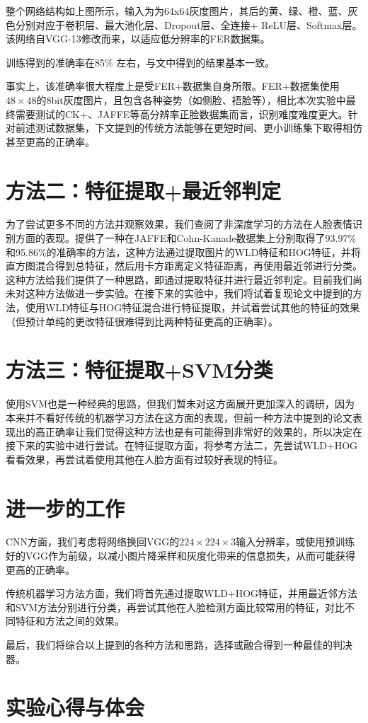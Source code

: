 \documentclass[UTF8]{ctexart}
\begin{document}
整个网络结构如上图所示，输入为为64x64灰度图片，其后的黄、绿、橙、蓝、灰色分别对应于卷积层、最大池化层、Dropout层、全连接+ ReLU层、Softmax层。该网络自VGG-13修改而来，以适应低分辨率的FER数据集。

训练得到的准确率在85\% 左右，与文中得到的结果基本一致。

事实上，该准确率很大程度上是受FER+数据集自身所限。FER+数据集使用$48\times48$的8bit灰度图片，且包含各种姿势（如侧脸、捂脸等），相比本次实验中最终需要测试的CK+、JAFFE等高分辨率正脸数据集而言，识别难度难度更大。针对前述测试数据集，下文提到的传统方法能够在更短时间、更小训练集下取得相仿甚至更高的正确率。

\section{方法二：特征提取+最近邻判定}

为了尝试更多不同的方法并观察效果，我们查阅了非深度学习的方法在人脸表情识别方面的表现。\cite{wang2013feature}提供了一种在JAFFE和Cohn-Kanade数据集上分别取得了93.97\%和95.86\%的准确率的方法，这种方法通过提取图片的WLD特征和HOG特征，并将直方图混合得到总特征，然后用卡方距离定义特征距离，再使用最近邻进行分类。这种方法给我们提供了一种思路，即通过提取特征并进行最近邻判定。目前我们尚未对这种方法做进一步实验。在接下来的实验中，我们将试着复现论文中提到的方法，使用WLD特征与HOG特征混合进行特征提取，并试着尝试其他的特征的效果（但预计单纯的更改特征很难得到比两种特征更高的正确率）。

\section{方法三：特征提取+SVM分类}

使用SVM也是一种经典的思路，但我们暂未对这方面展开更加深入的调研，因为本来并不看好传统的机器学习方法在这方面的表现，但前一种方法中提到的论文表现出的高正确率让我们觉得这种方法也是有可能得到非常好的效果的，所以决定在接下来的实验中进行尝试。在特征提取方面，将参考方法二，先尝试WLD+HOG看看效果，再尝试着使用其他在人脸方面有过较好表现的特征。

\section{进一步的工作}

CNN方面，我们考虑将网络换回VGG的$224\times224\times3$输入分辨率，或使用预训练好的VGG作为前级，以减小图片降采样和灰度化带来的信息损失，从而可能获得更高的正确率。

传统机器学习方法方面，我们将首先通过提取WLD+HOG特征，并用最近邻方法和SVM方法分别进行分类，再尝试其他在人脸检测方面比较常用的特征，对比不同特征和方法之间的效果。

最后，我们将综合以上提到的各种方法和思路，选择或融合得到一种最佳的判决器。

\section{实验心得与体会}




\end{document}
